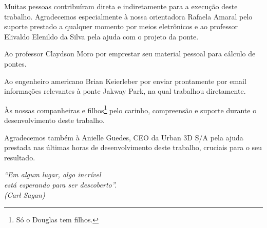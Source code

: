 \documentclass[
	12pt,				%
	openright,			%
	twoside,			%
	a4paper,			%
	english,			%
	french,				%
	spanish,			%
	brazil				%
	]{abntex2}
\begin{document}
%
\begin{agradecimentos}
Muitas pessoas contribuíram direta e indiretamente para a execução deste trabalho. Agradecemos especialmente à nossa orientadora Rafaela Amaral pelo suporte prestado a qualquer momento por meios eletrônicos e ao professor Elivaldo Elenildo da Silva pela ajuda com o projeto da ponte.

Ao professor Claydson Moro por emprestar seu material pessoal para cálculo de pontes.

Ao engenheiro americano Brian Keierleber por enviar prontamente por email informações relevantes à ponte Jakway Park, na qual trabalhou diretamente.

Às nossas companheiras e filhos\footnote{Só o Douglas tem filhos.} pelo carinho, compreensão e suporte durante o desenvolvimento deste trabalho.

Agradecemos também à Anielle Guedes, CEO da Urban 3D S/A pela ajuda prestada nas últimas horas de desenvolvimento deste trabalho, cruciais para o seu resultado.

\end{agradecimentos}

\begin{epigrafe}
    \vspace*{\fill}
	\begin{flushright}
		\textit{``Em algum lugar, algo incrível\\
		 está esperando para ser descoberto''.  \\
		(Carl Sagan)}
	\end{flushright}
\end{epigrafe}

\end{document}
